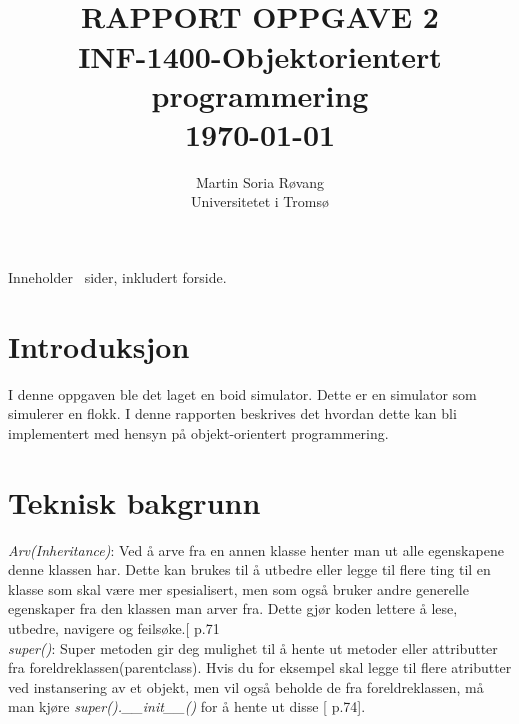 




{\selectfont
\title{ \normalsize \textsc{}
		\\ [3.0cm] %
        \LARGE \textbf{\uppercase{Rapport Oppgave 2}
        \HRule{0.5pt} \\ [0.5cm]
        INF-1400-Objektorientert programmering
        \\
		\normalsize \today \vspace*{5\baselineskip}}
		}

        \date{}
\author{
		Martin Soria Røvang \\ 
        Universitetet i Tromsø \\}

\clearpage\maketitle
\vspace{0.2\textheight}
{\centering
Inneholder \pageref{LastPage} \, sider, inkludert forside.\par
}
\thispagestyle{empty}

\newpage
\tableofcontents


\newpage

\section{Introduksjon}
I denne oppgaven ble det laget en boid simulator. Dette er en simulator som simulerer en flokk. I denne rapporten beskrives det hvordan dette kan bli implementert med hensyn på objekt-orientert programmering.

\section{Teknisk bakgrunn}
\emph{Arv(Inheritance)}: Ved å arve fra en annen klasse henter man ut alle egenskapene denne klassen har. Dette kan brukes til å utbedre eller legge til flere ting til en klasse som skal være mer spesialisert, men som også bruker andre generelle egenskaper fra den klassen man arver fra. Dette gjør koden lettere å lese, utbedre, navigere og feilsøke.[\cite{Dustyphil} p.71\\
\emph{super()}: Super metoden gir deg mulighet til å hente ut metoder eller attributter fra foreldreklassen(parentclass). Hvis du for eksempel skal legge til flere atributter ved instansering av et objekt, men vil også beholde de fra foreldreklassen, må man kjøre \emph{super().\_\_init\_\_()} for å hente ut disse [\cite{Dustyphil} p.74].

}
